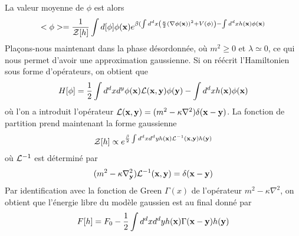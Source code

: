 La valeur moyenne de $\phi$ est alors
\begin{align}
    <\phi> =  \frac{1}{\mathcal{Z}[h]} \int d [\phi] \phi({\bf x}) e^{ \beta (\int d^d x \left( \frac{\kappa}{2} (\nabla \phi({\bf x}))^2 + V(\phi) \right) - \int d^d x h({\bf x}) \phi({\bf x})}
\end{align}
Plaçons-nous maintenant dans la phase désordonnée, où $m^2 \ge 0$ et $\lambda \simeq 0$, ce qui nous permet d'avoir une approximation gaussienne. Si on réécrit l'Hamiltonien sous forme d'opérateurs, on obtient que
\begin{align}
    H[\phi] = \frac{1}{2} \int d^d x d^y \phi({\bf x}) \mathcal{L}({\bf x},{\bf y}) \phi({\bf y}) - \int d^d x h({\bf x}) \phi({\bf x})
\end{align}
où l'on a introduit l'opérateur $\mathcal{L}({\bf x},{\bf y}) = (m^2 - \kappa \nabla^2) \delta({\bf x}-{\bf y})$.
La fonction de partition prend maintenant la forme gaussienne
\begin{align}
    \mathcal{Z}[h] \propto e^{\frac{\beta}{2} \int d^d x d^d y h({\bf x}) \mathcal{L}^{-1}({\bf x},{\bf y}) h({\bf y})}
\end{align}
où $\mathcal{L}^{-1}$ est déterminé par 
\begin{align}
    (m^2 - \kappa \nabla_{\bf y}^2) \mathcal{L}^{-1}({\bf x},{\bf y}) = \delta({\bf x}-{\bf y})
\end{align}
Par identification avec la fonction de Green $\Gamma(x)$ de l'opérateur $m^2 - \kappa \nabla^2$, on obtient que l'énergie libre du modèle gaussien est au final donné par 
\begin{align}
    F[h] = F_0 - \frac{1}{2} \int d^d x d^d y h({\bf x}) \Gamma({\bf x}-{\bf y}) h({\bf y})
\end{align}

